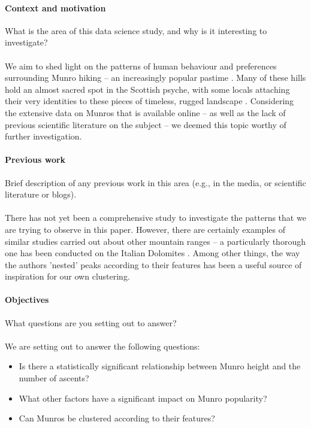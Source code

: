 \documentclass[11pt,a4paper]{article}
\begin{document}
\paragraph{Context and motivation}

What is the area of this data science study, and why is it interesting
to investigate? \\ \\
We aim to shed light on the patterns of human behaviour and preferences surrounding Munro hiking – an increasingly popular pastime \cite{CSM}. Many of these hills hold an almost sacred spot in the Scottish psyche, with some locals attaching their very identities to these pieces of timeless, rugged landscape \cite{HAE}. Considering the extensive data on Munros that is available online – as well as the lack of previous scientific literature on the subject – we deemed this topic worthy of further investigation.

\paragraph{Previous work}

Brief description of any previous work in this area (e.g., in the
media, or scientific literature or blogs). \\ \\
There has not yet been a comprehensive study to investigate the patterns that we are trying to observe in this paper. However, there are certainly examples of similar studies carried out about other mountain ranges – a particularly thorough one has been conducted on the Italian Dolomites \cite{HitA}. Among other things, the way the authors 'nested' peaks according to their features has been a useful source of inspiration for our own clustering. 

\paragraph{Objectives}

What questions are you setting out to answer? \\ \\
We are setting out to answer the following questions:
\begin{itemize}
    \item Is there a statistically significant relationship between Munro height and the number of ascents?
    \item What other factors have a significant impact on Munro popularity?
    \item Can Munros be clustered according to their features?
\end{itemize}
\end{document}
